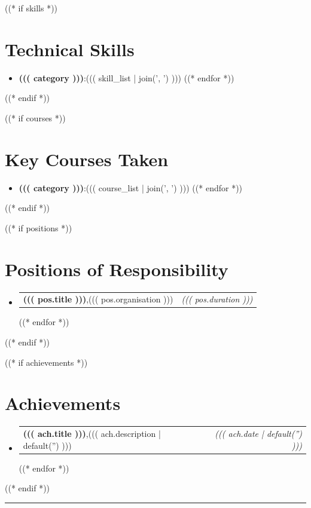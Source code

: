 \documentclass[a4paper,11pt]{article}
\makeatletter
\newcommand{\resumeItem}[2]{
  \item{
    \textbf{#1}{:\hspace{0.5mm}#2 \vspace{-0.5mm}}
  }
}
\newcommand{\resumePOR}[3]{
\vspace{0.5mm}\item
    \begin{tabular*}{0.97\textwidth}[t]{l@{\extracolsep{\fill}}r}
        \textbf{#1},\hspace{0.3mm}#2 & \textit{\small{#3}}
    \end{tabular*}
    \vspace{-2mm}
}
\newcommand{\resumeSubItem}[2]{\resumeItem{#1}{#2}\vspace{-4pt}}
\newcommand{\resumeSubHeadingListStart}{\begin{itemize}[leftmargin=*,labelsep=0mm]}
\newcommand{\resumeHeadingSkillStart}{\begin{itemize}[leftmargin=*,itemsep=1.7mm, rightmargin=2ex]}
\newcommand{\resumeSubHeadingListEnd}{\end{itemize}\vspace{2mm}}
\newcommand{\resumeHeadingSkillEnd}{\end{itemize}\vspace{-2mm}}
\makeatother
\begin{document}
((* if skills *))
\section{Technical Skills}
\resumeHeadingSkillStart
  ((* for category, skill_list in skills.items() *))
  \resumeSubItem{((( category )))}
    {((( skill_list | join(', ') )))}
  ((* endfor *))
\resumeHeadingSkillEnd
((* endif *))

((* if courses *))
\section{Key Courses Taken}
\resumeHeadingSkillStart
  ((* for category, course_list in courses.items() *))
  \resumeSubItem{((( category )))}
    {((( course_list | join(', ') )))}
  ((* endfor *))
\resumeHeadingSkillEnd
((* endif *))

((* if positions *))
\section{Positions of Responsibility}
\vspace{-0.4mm}
\resumeSubHeadingListStart
  ((* for pos in positions *))
  \resumePOR{((( pos.title )))}
    {((( pos.organisation )))}
    {((( pos.duration )))}
  ((* endfor *))
\resumeSubHeadingListEnd
\vspace{-4mm}
((* endif *))

((* if achievements *))
\section{Achievements}
\vspace{-0.2mm}
\resumeSubHeadingListStart
  ((* for ach in achievements *))
  \resumePOR{((( ach.title )))}
    {((( ach.description | default('') )))}
    {((( ach.date | default('') )))}
  ((* endfor *))
\resumeSubHeadingListEnd
((* endif *))

\hspace*{-5mm}\rule{1.035\textwidth}{0.1mm}
\end{document}
